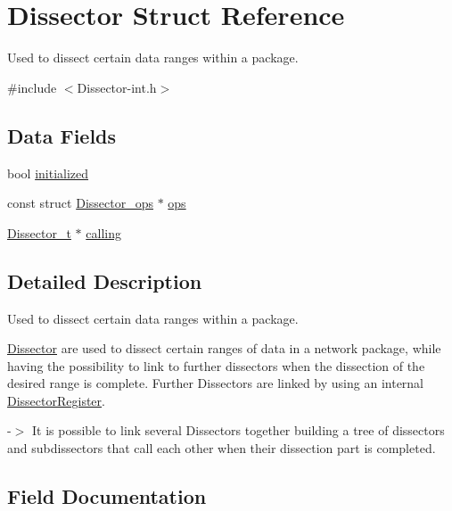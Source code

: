 \hypertarget{struct_dissector}{}\section{Dissector Struct Reference}
\label{struct_dissector}


Used to dissect certain data ranges within a package.  




{\ttfamily \#include $<$Dissector-\/int.\+h$>$}

\subsection*{Data Fields}
\begin{DoxyCompactItemize}
\item 
bool \hyperlink{struct_dissector_a86386b01b6edc229f64d438929d92a4f}{initialized}
\item 
const struct \hyperlink{struct_dissector__ops}{Dissector\+\_\+ops} $\ast$ \hyperlink{struct_dissector_a2786b3015a49f746ecbbc33840838a4e}{ops}
\item 
\hyperlink{struct_dissector}{Dissector\+\_\+t} $\ast$ \hyperlink{struct_dissector_a9c793579ef8c1fa11c26a0d146bc2f2c}{calling}
\end{DoxyCompactItemize}


\subsection{Detailed Description}
Used to dissect certain data ranges within a package. 

\hyperlink{struct_dissector}{Dissector} are used to dissect certain ranges of data in a network package, while having the possibility to link to further dissectors when the dissection of the desired range is complete. Further Dissectors are linked by using an internal \hyperlink{struct_dissector_register}{Dissector\+Register}.

-\/$>$ It is possible to link several Dissectors together building a tree of dissectors and subdissectors that call each other when their dissection part is completed. 

\subsection{Field Documentation}
\hypertarget{struct_dissector_a9c793579ef8c1fa11c26a0d146bc2f2c}{}
